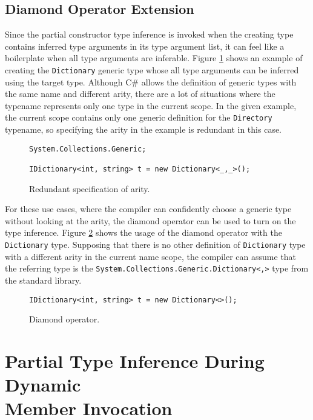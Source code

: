 \subsection{Diamond Operator Extension} \label{sect13:ex2}

Since the partial constructor type inference is invoked when the creating type contains inferred type arguments in its type argument list, it can feel like a boilerplate when all type arguments are inferable. 
Figure \ref{img57:diamondExample} shows an example of creating the \texttt{Dictionary} generic type whose all type arguments can be inferred using the target type. 
Although C\# allows the definition of generic types with the same name and different arity, there are a lot of situations where the typename represents only one type in the current scope.
In the given example, the current scope contains only one generic definition for the \texttt{Directory} typename, so specifying the arity in the example is redundant in this case.
\begin{figure}[h!]
\begin{lstlisting}[style=csharp, mathescape=true]
System.Collections.Generic;

IDictionary<int, string> t = new Dictionary<_,_>();
\end{lstlisting}
\caption{Redundant specification of arity.}
\label{img57:diamondExample}
\end{figure}
\par
For these use cases, where the compiler can confidently choose a generic type without looking at the arity, the diamond operator can be used to turn on the type inference. 
Figure \ref{img58:diamondExample2} shows the usage of the diamond operator with the \texttt{Dictionary} type. 
Supposing that there is no other definition of \texttt{Dictionary} type with a different arity in the current name scope, the compiler can assume that the referring type is the \texttt{System.Collections.Generic.Dictionary<,>} type from the standard library.
\begin{figure}[h!]
\begin{lstlisting}[style=csharp, mathescape=true]
IDictionary<int, string> t = new Dictionary<>();
\end{lstlisting}
\caption{Diamond operator.}
\label{img58:diamondExample2}
\end{figure}

\section{Partial Type Inference During Dynamic\\ Member Invocation} \label{sect11:dynamic}

